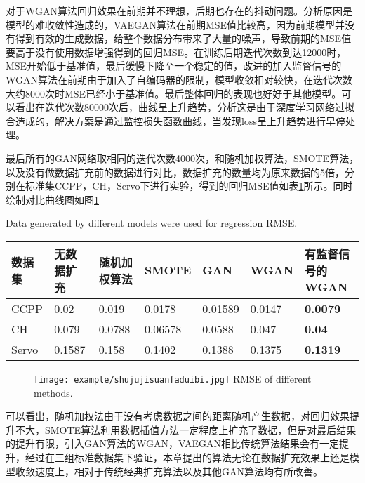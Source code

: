 对于WGAN算法回归效果在前期并不理想，后期也存在的抖动问题。分析原因是模型的难收敛性造成的，VAEGAN算法在前期MSE值比较高，因为前期模型并没有得到有效的生成数据，给整个数据分布带来了大量的噪声，导致前期的MSE值要高于没有使用数据增强得到的回归MSE。在训练后期迭代次数到达12000时，MSE开始低于基准值，最后缓慢下降至一个稳定的值，改进的加入监督信号的WGAN算法在前期由于加入了自编码器的限制，模型收敛相对较快，在迭代次数大约8000次时MSE已经小于基准值。最后整体回归的表现也好好于其他模型。可以看出在迭代次数80000次后，曲线呈上升趋势，分析这是由于深度学习网络过拟合造成的，解决方案是通过监控损失函数曲线，当发现loss呈上升趋势进行早停处理。

最后所有的GAN网络取相同的迭代次数4000次，和随机加权算法，SMOTE算法，以及没有做数据扩充前的数据进行对比，数据扩充的数量均为原来数据的5倍，分别在标准集CCPP，CH，Servo下进行实验，得到的回归MSE值如表\ref{tabMSE}所示。同时绘制对比曲线图如图\ref{tabMSE}


\begin{table}[htpb]
	\centering
	{Data generated by different models were used for regression RMSE.}
	\label{tabMSE}
	\begin{tabular}{lllllll} \toprule
		数据集 & 无数据扩充 & 随机加权算法&SMOTE&GAN&WGAN&有监督信号的WGAN \\  \midrule
		CCPP&0.02&0.019&0.0178&0.01589&0.0147&\textbf{0.0079}\\
		CH&0.079&0.0788&0.06578&0.0588&0.047&\textbf{0.04}\\
		Servo&0.1587&0.158&0.1402&0.1388&0.1375&\textbf{0.1319}\\
		 \bottomrule
	\end{tabular}
\end{table}



\begin{figure}[htpb]
	\centering
	\texttt{[image: example/shujujisuanfaduibi.jpg]}
	{RMSE of different methods.}
	\label{fig:MSE}
\end{figure}

可以看出，随机加权法由于没有考虑数据之间的距离随机产生数据，对回归效果提升不大，SMOTE算法利用数据插值方法一定程度上扩充了数据，但是对最后结果的提升有限，引入GAN算法的WGAN，VAEGAN相比传统算法结果会有一定提升，经过在三组标准数据集下验证，本章提出的算法无论在数据扩充效果上还是模型收敛速度上，相对于传统经典扩充算法以及其他GAN算法均有所改善。


